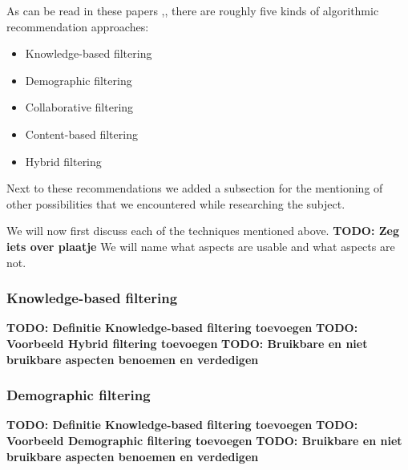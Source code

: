 \documentclass[]{article}
\newcommand{\TODO}[1]{{\color{red}\textbf{TODO: #1}}}
\begin{document}
As can be read in these papers \citep{Breese1998},\citep{Peter2007}, there are roughly five kinds of algorithmic recommendation approaches:

\begin{itemize}
\item Knowledge-based filtering \citep{Peter2007}
\item Demographic filtering \citep{Peter2007}
\item Collaborative filtering \citep{Peter2007}\citep{Breese1998}
\item Content-based filtering \citep{Peter2007}
\item Hybrid filtering
\end{itemize}

Next to these recommendations we added a subsection for the mentioning of other possibilities that we encountered while researching the subject.

We will now first discuss each of the techniques mentioned above.
\TODO{Zeg iets over plaatje}
We will name what aspects are usable and what aspects are not.

\subsubsection{Knowledge-based filtering}
\TODO{Definitie Knowledge-based filtering toevoegen}
\TODO{Voorbeeld Hybrid filtering toevoegen}
\TODO{Bruikbare en niet bruikbare aspecten benoemen en verdedigen}

\subsubsection{Demographic filtering}
\TODO{Definitie Knowledge-based filtering toevoegen}
\TODO{Voorbeeld Demographic filtering toevoegen}
\TODO{Bruikbare en niet bruikbare aspecten benoemen en verdedigen}
\end{document}
